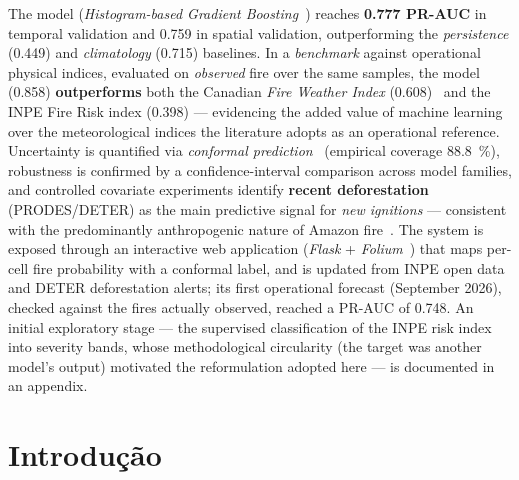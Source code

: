 \documentclass[tcc2]{uftex}
\begin{document}
\begin{foreignabstract}
The model (\emph{Histogram-based Gradient Boosting}~\cite{friedman2001greedy}) reaches \textbf{\num{0.777} PR-AUC} in temporal validation and \num{0.759} in spatial validation, outperforming the \emph{persistence} (\num{0.449}) and \emph{climatology} (\num{0.715}) baselines. In a \emph{benchmark} against operational physical indices, evaluated on \emph{observed} fire over the same samples, the model (\num{0.858}) \textbf{outperforms} both the Canadian \emph{Fire Weather Index} (\num{0.608})~\cite{vanwagner1985fwi} and the INPE Fire Risk index (\num{0.398}) --- evidencing the added value of machine learning over the meteorological indices the literature adopts as an operational reference. Uncertainty is quantified via \emph{conformal prediction}~\cite{sadinle2019lac} (empirical coverage \SI{88.8}{\percent}), robustness is confirmed by a confidence-interval comparison across model families, and controlled covariate experiments identify \textbf{recent deforestation} (PRODES/DETER) as the main predictive signal for \emph{new ignitions} --- consistent with the predominantly anthropogenic nature of Amazon fire~\cite{aragao2018amazon}. The system is exposed through an interactive web application (\emph{Flask} + \emph{Folium}~\cite{folium,leafletjs}) that maps per-cell fire probability with a conformal label, and is updated from INPE open data and DETER deforestation alerts; its first operational forecast (September 2026), checked against the fires actually observed, reached a PR-AUC of \num{0.748}. An initial exploratory stage --- the supervised classification of the INPE risk index into severity bands, whose methodological circularity (the target was another model's output) motivated the reformulation adopted here --- is documented in an appendix.
  \end{foreignabstract}
  \printlosymbols
  \printloabbreviations
  \listoffigures
  \listoftables
  \tableofcontents %
\mainmatter
\onehalfspacing
\chapter{Introdução}
\end{document}
